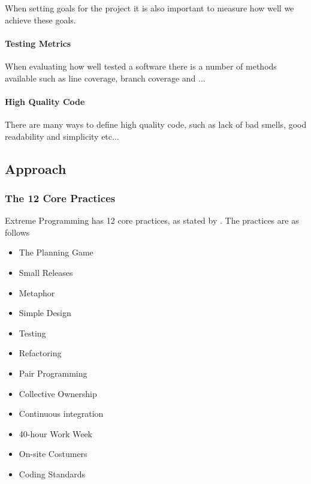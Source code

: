 When setting goals for the project it is also important to measure how well we achieve these goals. 
\paragraph{Testing Metrics}
When evaluating how well tested a software there is a number of methods available such as line coverage, branch coverage and ...

\paragraph{High Quality Code}
There are many ways to define high quality code, such as lack of bad smells, good readability and simplicity etc...




%

\subsection{Approach}
\subsubsection{The 12 Core Practices}
Extreme Programming has 12 core practices, as stated by \citet{xp:explained}. The practices are as follows

\begin{itemize}
\item The Planning Game
\item Small Releases
\item Metaphor
\item Simple Design
\item Testing
\item Refactoring
\item Pair Programming
\item Collective Ownership
\item Continuous integration
\item 40-hour Work Week
\item On-site Costumers
\item Coding Standards
\end{itemize}

